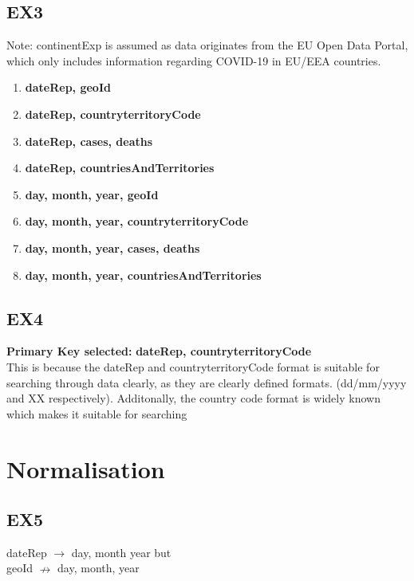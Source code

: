 \documentclass{article}
\begin{document}
\subsection{EX3}
\footnotesize{Note: continentExp is assumed as data originates from the EU Open Data Portal, which only includes information regarding COVID-19 in EU/EEA countries.}
\begin{enumerate}
\item \textbf{\fontsize{11}{13}\selectfont dateRep, geoId}
\item \textbf{\fontsize{11}{13}\selectfont dateRep, countryterritoryCode}
\item \textbf{\fontsize{11}{13}\selectfont dateRep, cases, deaths}
\item \textbf{\fontsize{11}{13}\selectfont dateRep, countriesAndTerritories}
\item \textbf{\fontsize{11}{13}\selectfont day, month, year, geoId}
\item \textbf{\fontsize{11}{13}\selectfont day, month, year, countryterritoryCode}
\item \textbf{\fontsize{11}{13}\selectfont day, month, year, cases, deaths}
\item \textbf{\fontsize{11}{13}\selectfont day, month, year, countriesAndTerritories}
\end{enumerate}
\subsection{EX4}
\textbf{Primary Key selected: }
\textbf{\fontsize{11}{13}\selectfont dateRep, countryterritoryCode} \\
\footnotesize{This is because the dateRep and countryterritoryCode format is suitable for searching through data clearly, as they are clearly defined formats. (dd/mm/yyyy and XX respectively). Additonally, the country code format is widely known which makes it suitable for searching}

\section{Normalisation}
\subsection{EX5}
{\fontsize{11}{13}\selectfont dateRep $\rightarrow$ day, month year but}\\
{\fontsize{11}{13}\selectfont geoId $\nrightarrow$ day, month, year }\\
\end{document}
